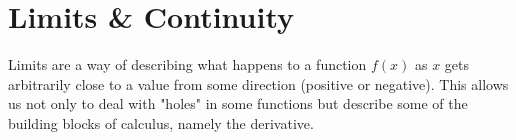\chapter{Limits \& Continuity}

Limits are a way of describing what happens to a function $f(x)$ as $x$ gets arbitrarily close to a value from some direction (positive or negative).
This allows us not only to deal with "holes" in some functions but describe some of the building blocks of calculus, namely the derivative.









